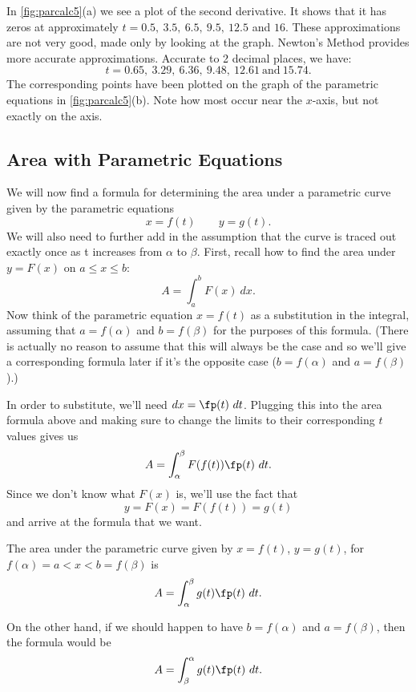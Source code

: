 \begin{example}
In \autoref{fig:parcalc5}(a) we see a plot of the second derivative. It shows that it has zeros at approximately $t=0.5,\ 3.5,\ 6.5,\ 9.5,\ 12.5$ and $16$. These approximations are not very good, made only by looking at the graph. Newton's Method provides more accurate approximations. Accurate to 2 decimal places, we have:
\[t=0.65,\ 3.29,\ 6.36,\ 9.48,\ 12.61\ \text{and}\ 15.74.\]
The corresponding points have been plotted on the graph of the parametric equations in \autoref{fig:parcalc5}(b). Note how most occur near the $x$-axis, but not exactly on the axis.
\end{example}


\subsection{Area with Parametric Equations}

We will now find a formula for determining the area under a parametric curve given by the parametric equations
\[x=f(t)\qquad y=g(t).\]
We will also need to further add in the assumption that the curve is traced out exactly once as t increases from $\alpha$ to $\beta$.
%
First, recall how to find the area under $y=F(x)$ on $a\le x\le b$:
\[A=\int_a^b F(x)\ dx.\]
Now think of the parametric equation $x=f(t)$ as a substitution in the integral, assuming that $a=f(\alpha)$ and $b=f(\beta)$ for the purposes of this formula.  (There is actually no reason to assume that this will always be the case and so we'll give a corresponding formula later if it's the opposite case ($b=f(\alpha)$ and $a=f(\beta)$).)

In order to substitute, we'll need $dx=\fp(t)\ dt$. Plugging this into the area formula above and making sure to change the limits to their corresponding $t$ values gives us
\[A=\int_\alpha^\beta F(f(t))\fp(t)\ dt.\]
Since we don't know what $F(x)$ is, we'll use the fact that
\[y=F(x)=F(f(t))=g(t)\]
and arrive at the formula that we want.

\begin{keyidea}\label{ki_param_area}
The area under the parametric curve given by $x=f(t)$, $y=g(t)$, for $f(\alpha)=a<x<b=f(\beta)$ is
\[A=\int_\alpha^\beta g(t)\fp(t)\ dt.\]
\end{keyidea}

On the other hand, if we should happen to have $b=f(\alpha)$ and $a=f(\beta)$, then the formula would be
\[A=\int_\beta^\alpha g(t)\fp(t)\ dt.\]

